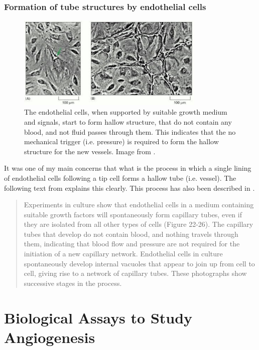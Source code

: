 \subsubsection*{Formation of tube structures by endothelial cells}

\begin{figure}[h!]
	\centering
	\includegraphics[width=0.8\textwidth]{images/hallowStructureEndothelialCells.jpg}
	\caption{The endothelial cells, when supported by suitable growth medium and signals, start to form hallow structure, that do not contain any blood, and not fluid passes through them. This indicates that the no mechanical trigger (i.e. pressure) is required to form the hallow structure for the new vessels. Image from \cite{Alberts2002}.}
\end{figure}

It was one of my main concerns that what is the process in which a single lining of endothelial cells following a tip cell forms a hallow tube (i.e. vessel). The following text from \cite{Alberts2002} explains this clearly. This process has also been described in \cite{angiogenesisYoutube}.


\begin{quote}
	Experiments in culture show that endothelial cells in a medium containing suitable growth factors will spontaneously form capillary tubes, even if they are isolated from all other types of cells (Figure 22-26). The capillary tubes that develop do not contain blood, and nothing travels through them, indicating that blood flow and pressure are not required for the initiation of a new capillary network. Endothelial cells in culture spontaneously develop internal vacuoles that appear to join up from cell to cell, giving rise to a network of capillary tubes. These photographs show successive stages in the process.
\end{quote}






\section{Biological Assays to Study Angiogenesis}

